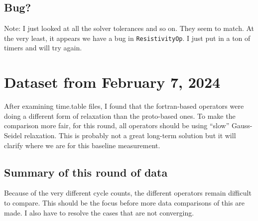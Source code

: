\documentclass{article}
\begin{document}
\subsection{Bug?}
Note: I just looked at all the solver tolerances and so on.  They seem
to match.   At the very least, it appears we have  a bug in {\tt ResistivityOp}.
I just put in a ton of timers and will try again.

\section{Dataset from February 7, 2024}

After examining time.table files, I found that the fortran-based
operators were doing a different form of relaxation than the
proto-based ones.    To make the comparison more fair, for this round,
all operators should be using ``slow'' Gauss-Seidel relaxation.
This is probably not a great long-term solution but it will clarify
where we are for this baseline measurement.

\subsection{Summary of this round of data}

Because of the very different cycle counts, the different operators
remain difficult to compare.   This should be the focus before more
data comparisons of this are made.    I also have to resolve the cases
that are not converging.
\end{document}
